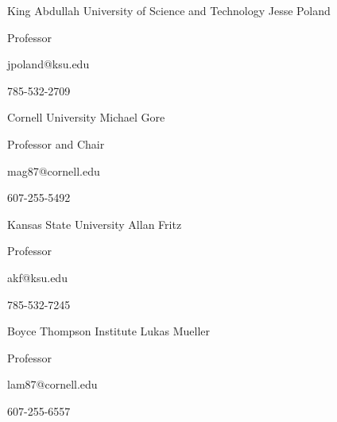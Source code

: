 
\begin{cventries}

  \cventry
    {King Abdullah University of Science and Technology} %
    {Jesse Poland} %
    {} %
    {} %
    {
      \begin{cvitems} %
        \item {Professor}
        \item {jpoland@ksu.edu}
        \item {785-532-2709}
      \end{cvitems}
    }

  \cventry
    {Cornell University} %
    {Michael Gore} %
    {} %
    {} %
    {
      \begin{cvitems} %
        \item {Professor and Chair}
        \item {mag87@cornell.edu}
        \item {607-255-5492}
      \end{cvitems}
    }

  \cventry
    {Kansas State University} %
    {Allan Fritz} %
    {} %
    {} %
    {
      \begin{cvitems} %
        \item {Professor}
        \item {akf@ksu.edu}
        \item {785-532-7245}
      \end{cvitems}
    }

  \cventry
    {Boyce Thompson Institute} %
    {Lukas Mueller} %
    {} %
    {} %
    {
      \begin{cvitems} %
        \item {Professor}
        \item {lam87@cornell.edu}
        \item {607-255-6557}
      \end{cvitems}
    }


\end{cventries}
